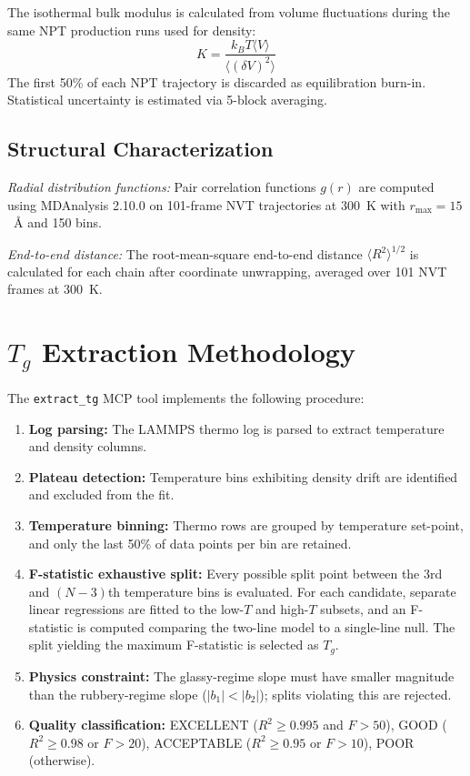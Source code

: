 \documentclass[journal=acsami,manuscript=suppinfo]{achemso}
\begin{document}
The isothermal bulk modulus is calculated from volume fluctuations\cite{allen2017computer} during the same NPT production runs used for density:
\begin{equation}
K = \frac{k_B T \langle V \rangle}{\langle (\delta V)^2 \rangle}
\end{equation}
The first 50\% of each NPT trajectory is discarded as equilibration burn-in.
Statistical uncertainty is estimated via 5-block averaging.

\subsection{Structural Characterization}

\emph{Radial distribution functions:} Pair correlation functions $g(r)$ are computed using MDAnalysis 2.10.0 on 101-frame NVT trajectories at 300~K with $r_{\max} = 15$~\AA{} and 150 bins.

\emph{End-to-end distance:} The root-mean-square end-to-end distance $\langle R^2 \rangle^{1/2}$ is calculated for each chain after coordinate unwrapping, averaged over 101 NVT frames at 300~K.


\section{$T_g$ Extraction Methodology}
\label{sec:si_tg_method}

The \texttt{extract\_tg} MCP tool implements the following procedure:

\begin{enumerate}
    \item \textbf{Log parsing:} The LAMMPS thermo log is parsed to extract temperature and density columns.
    \item \textbf{Plateau detection:} Temperature bins exhibiting density drift are identified and excluded from the fit.
    \item \textbf{Temperature binning:} Thermo rows are grouped by temperature set-point, and only the last 50\% of data points per bin are retained.
    \item \textbf{F-statistic exhaustive split:} Every possible split point between the 3rd and $(N-3)$th temperature bins is evaluated.
    For each candidate, separate linear regressions are fitted to the low-$T$ and high-$T$ subsets, and an F-statistic is computed comparing the two-line model to a single-line null.
    The split yielding the maximum F-statistic is selected as $T_g$.
    \item \textbf{Physics constraint:} The glassy-regime slope must have smaller magnitude than the rubbery-regime slope ($|b_1| < |b_2|$); splits violating this are rejected.
    \item \textbf{Quality classification:} EXCELLENT ($R^2 \geq 0.995$ and $F > 50$), GOOD ($R^2 \geq 0.98$ or $F > 20$), ACCEPTABLE ($R^2 \geq 0.95$ or $F > 10$), POOR (otherwise).
\end{enumerate}
\end{document}
